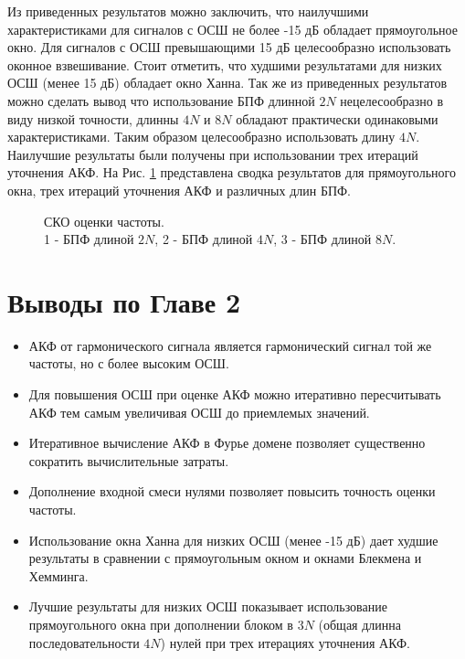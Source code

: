 Из приведенных результатов можно заключить, что наилучшими характеристиками для сигналов с ОСШ не более -15 дБ обладает прямоугольное окно. Для сигналов с ОСШ превышающими
15 дБ целесообразно использовать оконное взвешивание. Стоит отметить, что худшими результатами для низких ОСШ (менее 15 дБ) обладает окно Ханна.
Так же из приведенных результатов можно сделать вывод что использование БПФ длинной ${2N}$ нецелесообразно в виду низкой
точности, длинны ${4N}$ и ${8N}$ обладают практически одинаковыми характеристиками. Таким образом целесообразно использовать длину ${4N}$. Наилучшие результаты были получены при
использовании трех итераций уточнения АКФ. На Рис. \ref{pic:2vs4vs8} представлена сводка результатов для прямоугольного окна, трех итераций уточнения АКФ и различных длин БПФ.

\begin{figure}[h]
	\center{}
	\caption{СКО оценки частоты.\\1 - БПФ длиной ${2N}$, 2 - БПФ длиной ${4N}$, 3 - БПФ длиной ${8N}$.}
	\label{pic:2vs4vs8}
\end{figure}



\section{Выводы по Главе 2}

\begin{itemize}
\item АКФ от гармонического сигнала является гармонический сигнал той же частоты, но с более высоким ОСШ.
\item Для повышения ОСШ при оценке АКФ можно итеративно пересчитывать АКФ тем самым увеличивая ОСШ до приемлемых значений.
\item Итеративное вычисление АКФ в Фурье домене позволяет существенно сократить вычислительные затраты.
\item Дополнение входной смеси нулями позволяет повысить точность оценки частоты.
\item Использование окна Ханна для низких ОСШ (менее -15 дБ) дает худшие результаты в сравнении с прямоугольным окном и окнами Блекмена и Хемминга.
\item Лучшие результаты для низких ОСШ показывает использование прямоугольного окна при дополнении блоком в ${3N}$ (общая длинна последовательности ${4N}$) нулей при трех
	итерациях уточнения АКФ.
\end{itemize}


\clearpage
